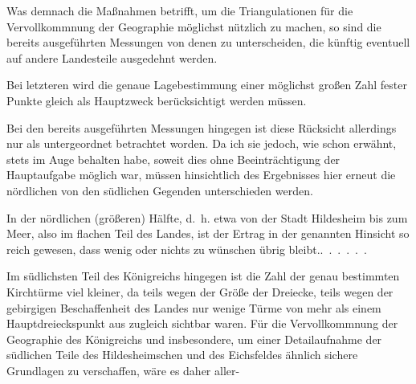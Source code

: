 Was demnach die Maßnahmen betrifft, um die Triangulationen für die
Vervollkommnung der Geographie möglichst nützlich zu machen, so sind die
bereits ausgeführten Messungen von denen zu unterscheiden, die künftig
eventuell auf andere Landesteile ausgedehnt werden.

Bei letzteren wird die genaue Lagebestimmung einer möglichst großen Zahl
fester Punkte gleich als Hauptzweck berücksichtigt werden müssen.

Bei den bereits ausgeführten Messungen hingegen ist diese Rücksicht
allerdings nur als untergeordnet betrachtet worden. Da ich sie jedoch, wie
schon erwähnt, stets im Auge behalten habe, soweit dies ohne Beeinträchtigung
der Hauptaufgabe möglich war, müssen hinsichtlich des Ergebnisses hier
erneut die nördlichen von den südlichen Gegenden unterschieden werden.

In der nördlichen (größeren) Hälfte, d.~h. etwa von der Stadt Hildesheim bis
zum Meer, also im flachen Teil des Landes, ist der Ertrag in der genannten
Hinsicht so reich gewesen, dass wenig oder nichts zu wünschen übrig bleibt.\quad\mbox{.\ .\ .\ .\ .\ .}

Im südlichsten Teil des Königreichs hingegen ist die Zahl der genau
bestimmten Kirchtürme viel kleiner, da teils wegen der Größe der Dreiecke,
teils wegen der gebirgigen Beschaffenheit des Landes nur wenige Türme von
mehr als einem Hauptdreieckspunkt aus zugleich sichtbar waren. Für die
Vervollkommnung der Geographie des Königreichs und insbesondere, um einer
Detailaufnahme der südlichen Teile des Hildesheimschen und des Eichsfeldes
ähnlich sichere Grundlagen zu verschaffen, wäre es daher \mbox{aller-}
\par

